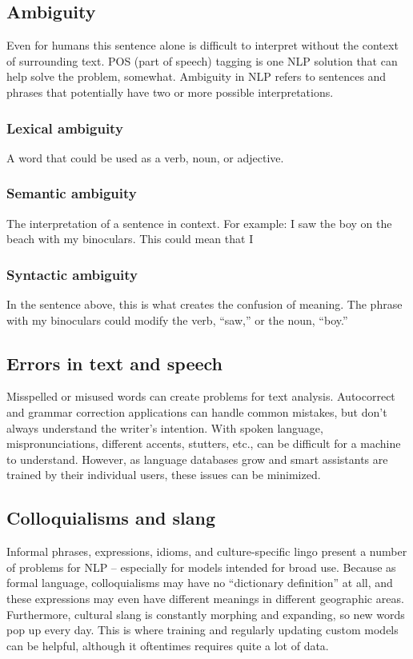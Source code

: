 \documentclass[11pt]{article}
\begin{document}
\subsection{Ambiguity}
\label{sec:orge416433}
Even for humans this sentence alone is difficult to interpret without
the context of surrounding text. POS (part of speech) tagging is one NLP solution
that can help solve the problem, somewhat.
Ambiguity in NLP refers to sentences and phrases that potentially have two or more
possible interpretations.

\subsubsection{Lexical ambiguity}
\label{sec:orge93ba59}
A word that could be used as a verb, noun, or adjective.
\subsubsection{Semantic ambiguity}
\label{sec:org5c41a6a}
The interpretation of a sentence in context. For example: I saw the boy on the
beach with my binoculars. This could mean that I
\subsubsection{Syntactic ambiguity}
\label{sec:org0a57ef2}
In the sentence above, this is what creates the confusion of meaning.
The phrase with my binoculars could modify the verb, “saw,” or the noun, “boy.”

\subsection{Errors in text and speech}
\label{sec:org34b1e3a}
Misspelled or misused words can create problems for text analysis. Autocorrect and
grammar correction applications can handle common mistakes, but don’t always
understand the writer’s intention.
With spoken language, mispronunciations, different accents, stutters, etc., can
be difficult for a machine to understand. However, as language databases grow and
smart assistants are trained by their individual users, these issues can be minimized.
\subsection{Colloquialisms and slang}
\label{sec:orgdeb5f70}
Informal phrases, expressions, idioms, and culture-specific lingo present a number
of problems for NLP – especially for models intended for broad use. Because as formal
language, colloquialisms may have no “dictionary definition” at all, and these
expressions may even have different meanings in different geographic areas.
Furthermore, cultural slang is constantly morphing and expanding, so new words
pop up every day.
This is where training and regularly updating custom models can be helpful,
although it oftentimes requires quite a lot of data.
\end{document}
